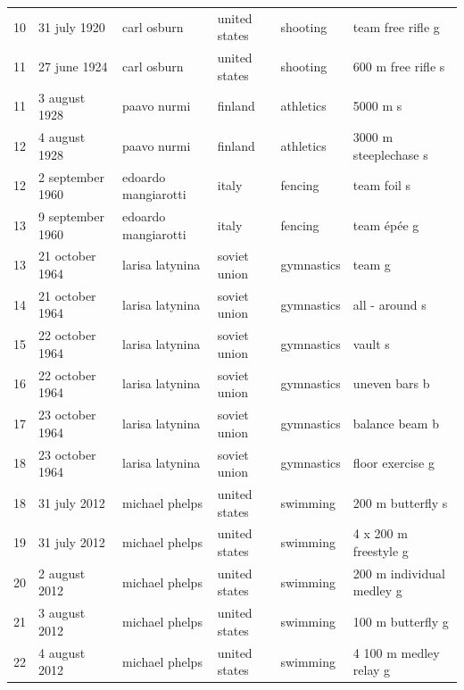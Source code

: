 \documentclass{article}
\begin{document}
\begin{tabular}{llllll}
10 & 31 july 1920 & carl osburn & united states & shooting & team free rifle g \\
11 & 27 june 1924 & carl osburn & united states & shooting & 600 m free rifle s \\
11 & 3 august 1928 & paavo nurmi & finland & athletics & 5000 m s \\
12 & 4 august 1928 & paavo nurmi & finland & athletics & 3000 m steeplechase s \\
12 & 2 september 1960 & edoardo mangiarotti & italy & fencing & team foil s \\
13 & 9 september 1960 & edoardo mangiarotti & italy & fencing & team épée g \\
13 & 21 october 1964 & larisa latynina & soviet union & gymnastics & team g \\
14 & 21 october 1964 & larisa latynina & soviet union & gymnastics & all - around s \\
15 & 22 october 1964 & larisa latynina & soviet union & gymnastics & vault s \\
16 & 22 october 1964 & larisa latynina & soviet union & gymnastics & uneven bars b \\
17 & 23 october 1964 & larisa latynina & soviet union & gymnastics & balance beam b \\
18 & 23 october 1964 & larisa latynina & soviet union & gymnastics & floor exercise g \\
18 & 31 july 2012 & michael phelps & united states & swimming & 200 m butterfly s \\
19 & 31 july 2012 & michael phelps & united states & swimming & 4 x 200 m freestyle g \\
20 & 2 august 2012 & michael phelps & united states & swimming & 200 m individual medley g \\
21 & 3 august 2012 & michael phelps & united states & swimming & 100 m butterfly g \\
22 & 4 august 2012 & michael phelps & united states & swimming & 4 100 m medley relay g \\
\bottomrule
\end{tabular}
\end{document}
